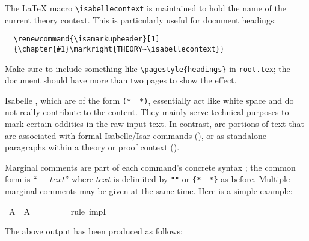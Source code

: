 \begin{isabellebody}
\begin{isamarkuptext}
  \medskip The {\LaTeX} macro \verb,\isabellecontext, is maintained to
  hold the name of the current theory context.  This is particularly
  useful for document headings:

\begin{verbatim}
  \renewcommand{\isamarkupheader}[1]
  {\chapter{#1}\markright{THEORY~\isabellecontext}}
\end{verbatim}

  \noindent Make sure to include something like
  \verb,\pagestyle{headings}, in \texttt{root.tex}; the document
  should have more than two pages to show the effect.%
\end{isamarkuptext}%
\isamarkuptrue%
%
\isamarkuptrue%
%
\begin{isamarkuptext}%
Isabelle , which are of the form
  \verb,(,\verb,*,~\isa{{\isasymdots}}~\verb,*,\verb,),, essentially act like
  white space and do not really contribute to the content.  They
  mainly serve technical purposes to mark certain oddities in the raw
  input text.  In contrast,  are portions of
  text that are associated with formal Isabelle/Isar commands
  (), or as standalone paragraphs within a
  theory or proof context ().

  \medskip Marginal comments are part of each command's concrete
  syntax \cite{isabelle-ref}; the common form is ``\verb,--,~$text$''
  where $text$ is delimited by \verb,",\isa{{\isasymdots}}\verb,", or
  \verb,{,\verb,*,~\isa{{\isasymdots}}~\verb,*,\verb,}, as before.  Multiple
  marginal comments may be given at the same time.  Here is a simple
  example:%
\end{isamarkuptext}%
\isamarkuptrue%
\isamarkupfalse%
\ {\isachardoublequoteopen}A\ {\isacharminus}{\isacharminus}{\isachargreater}\ A{\isachardoublequoteclose}\isanewline
\ \ %
\isanewline
\ \ %
\isanewline
%
\isadelimproof
\ \ %
\endisadelimproof
%
\isatagproof
{}\isamarkupfalse%
\ {\isacharparenleft}rule\ impI{\isacharparenright}\ %
%
\endisatagproof
{\isafoldproof}%
%
\isadelimproof
%
\endisadelimproof
%
\begin{isamarkuptext}%
\noindent The above output has been produced as follows:


\end{isamarkuptext}
\end{isabellebody}
